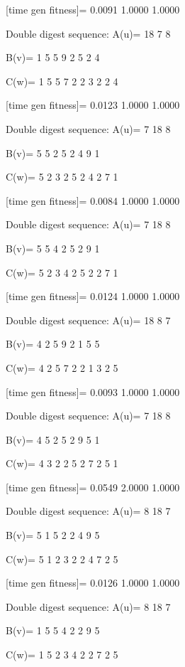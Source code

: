 [time gen fitness]=
    0.0091    1.0000    1.0000

Double digest sequence:
A(u)=
    18     7     8

B(v)=
     1     5     5     9     2     5     2     4

C(w)=
     1     5     5     7     2     2     3     2     2     4

[time gen fitness]=
    0.0123    1.0000    1.0000

Double digest sequence:
A(u)=
     7    18     8

B(v)=
     5     5     2     5     2     4     9     1

C(w)=
     5     2     3     2     5     2     4     2     7     1

[time gen fitness]=
    0.0084    1.0000    1.0000

Double digest sequence:
A(u)=
     7    18     8

B(v)=
     5     5     4     2     5     2     9     1

C(w)=
     5     2     3     4     2     5     2     2     7     1

[time gen fitness]=
    0.0124    1.0000    1.0000

Double digest sequence:
A(u)=
    18     8     7

B(v)=
     4     2     5     9     2     1     5     5

C(w)=
     4     2     5     7     2     2     1     3     2     5

[time gen fitness]=
    0.0093    1.0000    1.0000

Double digest sequence:
A(u)=
     7    18     8

B(v)=
     4     5     2     5     2     9     5     1

C(w)=
     4     3     2     2     5     2     7     2     5     1

[time gen fitness]=
    0.0549    2.0000    1.0000

Double digest sequence:
A(u)=
     8    18     7

B(v)=
     5     1     5     2     2     4     9     5

C(w)=
     5     1     2     3     2     2     4     7     2     5

[time gen fitness]=
    0.0126    1.0000    1.0000

Double digest sequence:
A(u)=
     8    18     7

B(v)=
     1     5     5     4     2     2     9     5

C(w)=
     1     5     2     3     4     2     2     7     2     5


